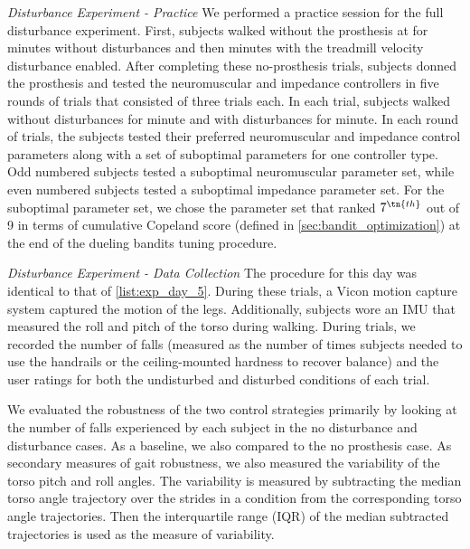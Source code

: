 \begin{days}
    \item\label{list:exp_day_5} \emph{Disturbance Experiment - Practice} We
    performed a practice session for the full disturbance experiment. First,
    subjects walked without the prosthesis at  for
    \unit[2]{minutes} without disturbances and then \unit[2]{minutes} with the
    treadmill velocity disturbance enabled. After completing these no-prosthesis
    trials, subjects donned the prosthesis and tested the neuromuscular and
    impedance controllers in five rounds of trials that consisted of three
    trials each. In each trial, subjects walked without disturbances for
    \unit[1]{minute} and with disturbances for \unit[1]{minute}. In each round
    of trials, the subjects tested their preferred neuromuscular and impedance
    control parameters along with a set of suboptimal parameters for one
    controller type. Odd numbered subjects tested a suboptimal neuromuscular
    parameter set, while even numbered subjects tested a suboptimal impedance
    parameter set. For the suboptimal parameter set, we chose the parameter set
    that ranked $7^\tn{th}$ out of 9 in terms of cumulative Copeland score
    (defined in \cref{sec:bandit_optimization}) at the end of the dueling
    bandits tuning procedure.

    \item\label{list:exp_day_6} \emph{Disturbance Experiment - Data Collection}
    The procedure for this day was identical to that of \cref{list:exp_day_5}.
    During these trials, a Vicon motion capture system captured the motion of
    the legs. Additionally, subjects wore an IMU that measured the roll and
    pitch of the torso during walking. During trials, we recorded the number of
    falls (measured as the number of times subjects needed to use the handrails
    or the ceiling-mounted hardness to recover balance) and the user ratings for
    both the undisturbed and disturbed conditions of each trial. 
\end{days}

We evaluated the robustness of the two control strategies primarily by looking
at the number of falls experienced by each subject in the no disturbance and
disturbance cases. As a baseline, we also compared to the no prosthesis case. As
secondary measures of gait robustness, we also measured the variability of the
torso pitch and roll angles. The variability is measured by subtracting the
median torso angle trajectory over the strides in a condition from the
corresponding torso angle trajectories. Then the interquartile range (IQR) of
the median subtracted trajectories is used as the measure of variability.

